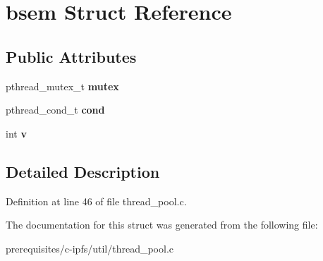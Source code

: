 \hypertarget{structbsem}{}\section{bsem Struct Reference}
\label{structbsem}
\subsection*{Public Attributes}
\begin{DoxyCompactItemize}
\item 
\mbox{\label{structbsem_aeb72d3f55aa3db011cd2156d23d605f2}} 
pthread\+\_\+mutex\+\_\+t {\bfseries mutex}
\item 
\mbox{\label{structbsem_a1de6d1a860798f0122ee54b86634cc8b}} 
pthread\+\_\+cond\+\_\+t {\bfseries cond}
\item 
\mbox{\label{structbsem_a93015f0c1392761b9933fd43353a0ab1}} 
int {\bfseries v}
\end{DoxyCompactItemize}


\subsection{Detailed Description}


Definition at line 46 of file thread\+\_\+pool.\+c.



The documentation for this struct was generated from the following file\+:\begin{DoxyCompactItemize}
\item 
prerequisites/c-\/ipfs/util/thread\+\_\+pool.\+c\end{DoxyCompactItemize}
